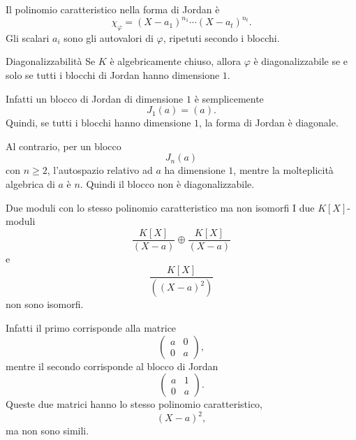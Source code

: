 \documentclass[a4paper]{article}
\begin{document}
\begin{radioactive}
\begin{snippetremark}{}
    Il polinomio caratteristico nella forma di Jordan è
    \[
        \chi_\varphi
        =
        (X-a_1)^{n_1}\cdots (X-a_t)^{n_t}.
    \]
    Gli scalari \(a_i\) sono gli autovalori di \(\varphi\), ripetuti secondo i blocchi.
\end{snippetremark}
\end{radioactive}

\begin{radioactive}
\begin{snippetremark}{Diagonalizzabilità}
    Se \(K\) è algebricamente chiuso, allora \(\varphi\) è diagonalizzabile se e solo se tutti i blocchi di Jordan hanno dimensione \(1\).

    Infatti un blocco di Jordan di dimensione \(1\) è semplicemente
    \[
        J_1(a)=(a).
    \]
    Quindi, se tutti i blocchi hanno dimensione \(1\), la forma di Jordan è diagonale.

    Al contrario, per un blocco
    \[
        J_n(a)
    \]
    con \(n\geq 2\), l'autospazio relativo ad \(a\) ha dimensione \(1\), mentre la molteplicità algebrica di \(a\) è \(n\). Quindi il blocco non è diagonalizzabile.
\end{snippetremark}
\end{radioactive}

\begin{radioactive}
\begin{snippetexample}{Due moduli con lo stesso polinomio caratteristico ma non isomorfi}
    I due \(K[X]\)-moduli
    \[
        \frac{K[X]}{(X-a)}
        \oplus
        \frac{K[X]}{(X-a)}
    \]
    e
    \[
        \frac{K[X]}{((X-a)^2)}
    \]
    non sono isomorfi.

    Infatti il primo corrisponde alla matrice
    \[
        \begin{pmatrix}
            a & 0\\
            0 & a
        \end{pmatrix},
    \]
    mentre il secondo corrisponde al blocco di Jordan
    \[
        \begin{pmatrix}
            a & 1\\
            0 & a
        \end{pmatrix}.
    \]
    Queste due matrici hanno lo stesso polinomio caratteristico,
    \[
        (X-a)^2,
    \]
    ma non sono simili.
\end{snippetexample}
\end{radioactive}
\end{document}
